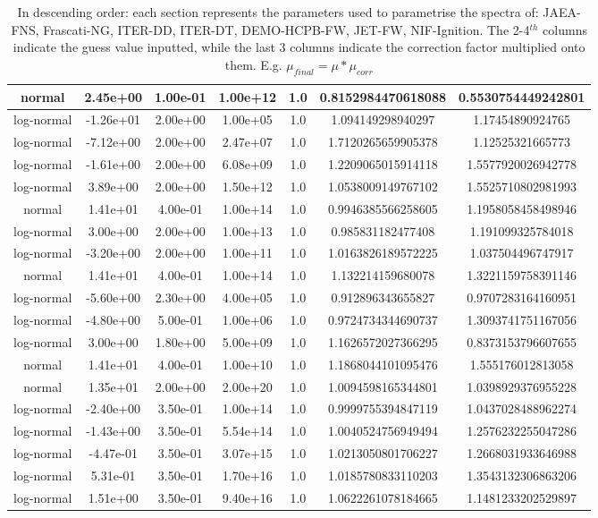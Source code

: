 \documentclass[a4paper, 12pt]{article}
\begin{document}
\begin{appendices}
\begin{table}
\begin{tabular}{ccccccc}
normal&2.45e+00&1.00e-01&1.00e+12&1.0&0.8152984470618088&0.5530754449242801\\
\hline
log-normal&-1.26e+01&2.00e+00&1.00e+05&1.0&1.094149298940297&1.17454890924765\\
log-normal&-7.12e+00&2.00e+00&2.47e+07&1.0&1.7120265659905378&1.12525321665773\\
log-normal&-1.61e+00&2.00e+00&6.08e+09&1.0&1.2209065015914118&1.5577920026942778\\
log-normal&3.89e+00&2.00e+00&1.50e+12&1.0&1.0538009149767102&1.5525710802981993\\
normal&1.41e+01&4.00e-01&1.00e+14&1.0&0.9946385566258605&1.1958058458498946\\
\hline
log-normal&3.00e+00&2.00e+00&1.00e+13&1.0&0.985831182477408&1.191099325784018\\
log-normal&-3.20e+00&2.00e+00&1.00e+11&1.0&1.0163826189572225&1.037504496747917\\
normal&1.41e+01&4.00e-01&1.00e+14&1.0&1.132214159680078&1.3221159758391146\\
\hline
log-normal&-5.60e+00&2.30e+00&4.00e+05&1.0&0.912896343655827&0.9707283164160951\\
log-normal&-4.80e+00&5.00e-01&1.00e+06&1.0&0.9724734344690737&1.3093741751167056\\
log-normal&3.00e+00&1.80e+00&5.00e+09&1.0&1.1626572027366295&0.8373153796607655\\
normal&1.41e+01&4.00e-01&1.00e+10&1.0&1.1868044101095476&1.555176012813058\\
\hline
normal&1.35e+01&2.00e+00&2.00e+20&1.0&1.0094598165344801&1.0398929376955228\\
log-normal&-2.40e+00&3.50e-01&1.00e+14&1.0&0.9999755394847119&1.0437028488962274\\
log-normal&-1.43e+00&3.50e-01&5.54e+14&1.0&1.0040524756949494&1.2576232255047286\\
log-normal&-4.47e-01&3.50e-01&3.07e+15&1.0&1.0213050801706227&1.2668031933646988\\
log-normal&5.31e-01&3.50e-01&1.70e+16&1.0&1.0185780833110203&1.3543132306863206\\
log-normal&1.51e+00&3.50e-01&9.40e+16&1.0&1.0622261078184665&1.1481233202529897
\end{tabular}
\caption{In descending order: each section represents the parameters used to parametrise the spectra of: JAEA-FNS, Frascati-NG, ITER-DD, ITER-DT, DEMO-HCPB-FW, JET-FW, NIF-Ignition. The 2-4${}^{th}$ columns indicate the guess value inputted, while the last 3 columns indicate the correction factor multiplied onto them. E.g. $\mu_{final} = \mu * \mu_{corr}$}\label{ParametrisationParameters}
\end{table}

\end{appendices}
\end{document}
